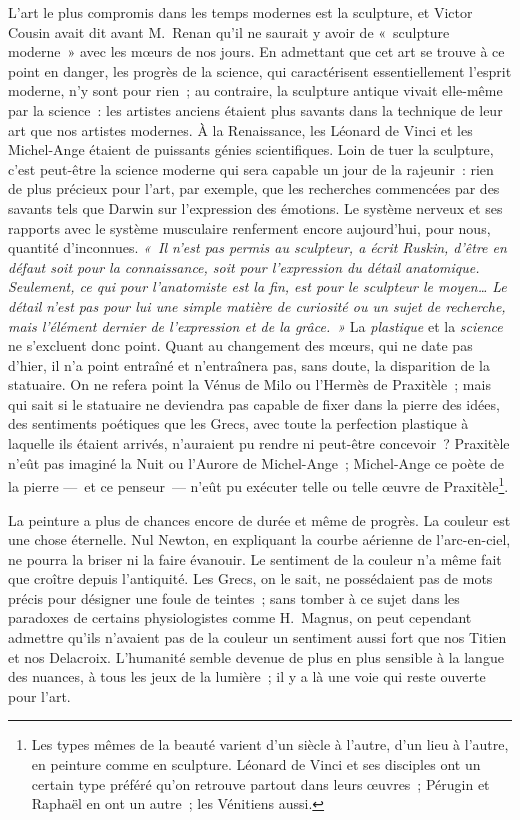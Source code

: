 \documentclass[french,twoside]{book} %
\begin{document}
L’art le plus compromis dans les temps modernes est la sculpture, et Victor Cousin avait dit avant M. Renan qu’il ne saurait y avoir de « sculpture moderne » avec les mœurs de nos jours. En admettant que cet art se  trouve à ce point en danger, les progrès de la science, qui caractérisent essentiellement l’esprit moderne, n’y sont pour rien ; au contraire, la sculpture antique vivait elle-même par la science : les artistes anciens étaient plus savants dans la technique de leur art que nos artistes modernes. À la Renaissance, les Léonard de Vinci et les Michel-Ange étaient de puissants génies scientifiques. Loin de tuer la sculpture, c’est peut-être la science moderne qui sera capable un jour de la rajeunir : rien de plus précieux pour l’art, par exemple, que les recherches commencées par des savants tels que Darwin sur l’expression des émotions. Le système nerveux et ses rapports avec le système musculaire renferment encore aujourd’hui, pour nous, quantité d’inconnues. \emph{« Il n’est pas permis au sculpteur, a écrit Ruskin, d’être en défaut soit pour la connaissance, soit pour l’expression du détail anatomique. Seulement, ce qui pour l’anatomiste est la fin, est pour le sculpteur le moyen… Le \emph{détail} n’est pas pour lui une simple matière de curiosité ou un sujet de recherche, mais l’élément dernier de l’\emph{expression} et de la \emph{grâce}. »} La \emph{plastique} et la \emph{science} ne s’excluent donc point. Quant au changement des mœurs, qui ne date pas d’hier, il n’a point entraîné et n’entraînera pas, sans doute, la disparition de la statuaire. On ne refera point la Vénus de Milo ou l’Hermès de Praxitèle ; mais qui sait si le statuaire ne deviendra pas capable de fixer dans la pierre des idées, des sentiments poétiques que les Grecs, avec toute la perfection plastique à laquelle ils étaient arrivés, n’auraient pu rendre ni peut-être concevoir ? Praxitèle n’eût pas imaginé la Nuit ou l’Aurore de  Michel-Ange ; Michel-Ange ce poète de la pierre — et ce penseur — n’eût pu exécuter telle ou telle œuvre de Praxitèle\footnote{Les types mêmes de la beauté varient d’un siècle à l’autre, d’un lieu à l’autre, en peinture comme en sculpture. Léonard de Vinci et ses disciples ont un certain type préféré qu’on retrouve partout dans leurs œuvres ; Pérugin et Raphaël en ont un autre ; les Vénitiens aussi.}.\par
La peinture a plus de chances encore de durée et même de progrès. La couleur est une chose éternelle. Nul Newton, en expliquant la courbe aérienne de l’arc-en-ciel, ne pourra la briser ni la faire évanouir. Le sentiment de la couleur n’a même fait que croître depuis l’antiquité. Les Grecs, on le sait, ne possédaient pas de mots précis pour désigner une foule de teintes ; sans tomber à ce sujet dans les paradoxes de certains physiologistes comme H. Magnus, on peut cependant admettre qu’ils n’avaient pas de la couleur un sentiment aussi fort que nos Titien et nos Delacroix. L’humanité semble devenue de plus en plus sensible à la langue des nuances, à tous les jeux de la lumière ; il y a là une voie qui reste ouverte pour l’art.\par
\end{document}
